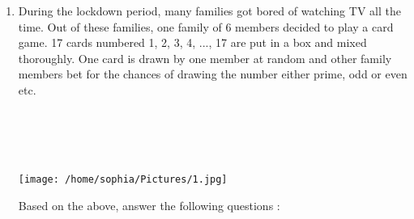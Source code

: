 \documentclass{exam}
\begin{document}
	\begin{enumerate}

		\item During the lockdown period, many families got bored of watching TV all the time. Out of these families, one family of 6 members decided to play a card game. 17 cards numbered 1, 2, 3, 4, ..., 17 are put in a box and mixed thoroughly. One card is drawn by one member at random and other family members bet for the chances of drawing the number either prime, odd or even etc. 
		\\
		\\
		\\
		\\
		\\
		\begin{center}
			\texttt{[image: /home/sophia/Pictures/1.jpg]}
		\end{center}
		Based on the above, answer the following questions : 
		

\end{enumerate}
\end{document}
